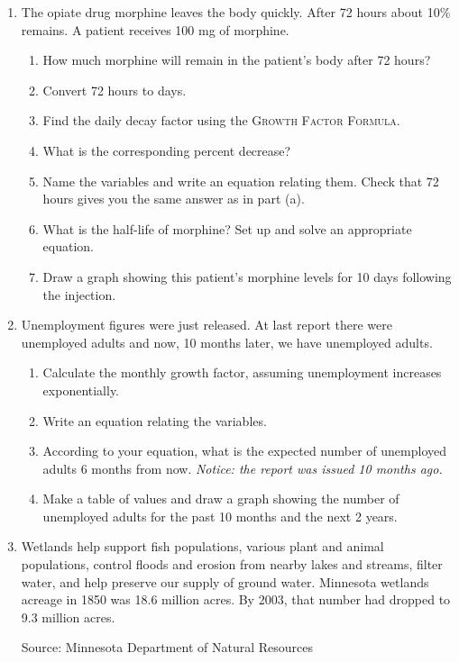 \begin{enumerate}
\item The opiate drug morphine leaves the body quickly.  After 72 hours about 10\% remains.  A patient receives 100 mg of morphine.
\begin{enumerate}
\item How much morphine will remain in the patient's body after 72 hours?
\item Convert 72 hours to days.
\item Find the daily decay factor using the \textsc{Growth Factor Formula}.
\item What is the corresponding percent decrease?
\item Name the variables and write an equation relating them.  Check that 72 hours gives you the same answer as in part (a).
\item What is the half-life of morphine?  Set up and solve an appropriate equation.
\item Draw a graph showing this patient's morphine levels for 10 days following the injection.
\end{enumerate}

\item Unemployment figures were just released.  At last report there were  unemployed adults and now, 10 months later, we have  unemployed adults.  \begin{enumerate}
\item Calculate the monthly growth factor, assuming unemployment increases exponentially.
\item Write an equation relating the variables.
\item According to your equation, what is the expected number of unemployed adults 6 months from now.  \emph{Notice:  the report was issued 10 months ago.}
\item Make a table of values and draw a graph showing the number of unemployed adults for the past 10 months and the next 2 years.
\end{enumerate}

\item Wetlands help support fish populations, various plant and animal populations, control floods and erosion from nearby lakes and streams, filter water, and help preserve our supply of ground water. 
 Minnesota wetlands acreage in 1850 was 18.6 million acres.  By 2003, that number had dropped to 9.3 million acres. 
 
 \hfill \begin{footnotesize} Source:  Minnesota Department of Natural Resources \end{footnotesize}


\end{enumerate}
